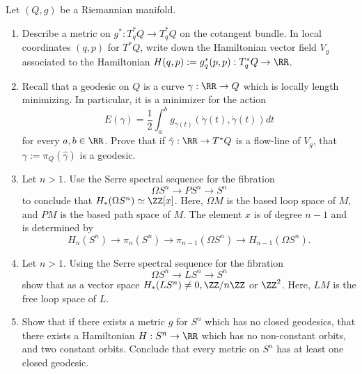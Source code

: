 
 
 \label{exr:geodesicsInSymplecticCohomology}
Let $(Q, g)$ be a Riemannian manifold. 
\begin{enumerate}
    \item Describe a metric on $ g^*:T^*_qQ\to T^*_qQ$ on the cotangent bundle. In local coordinates $(q, p)$ for $T^*Q$,  write down the Hamiltonian vector field $V_g$ associated to the Hamiltonian $H(q, p):=g_q^*(p, p): T^*_qQ\to \RR$.
    \item Recall that a geodesic on $Q$ is a curve $\gamma:\RR\to Q$ which is locally length minimizing. In particular, it is a minimizer for the action 
    \[E(\gamma)=\frac{1}{2}\int_a^b g_{\gamma(t)}(\dot \gamma(t), \dot \gamma(t)) dt\]
    for every $a,b\in \RR$. Prove that if $\hat \gamma: \RR\to T^*Q$ is a flow-line of $V_g$, that $\gamma:=\pi_Q(\hat \gamma)$ is a geodesic.
    \item Let $n>1$. Use the Serre spectral sequence for the fibration 
    \[\Omega S^n\to PS^n\to S^n\]
    to conclude that $H_*(\Omega S^n)\simeq \ZZ[x]$. Here, $\Omega M$ is the based loop space of $M$, and $PM$ is the based path space of $M$. The element $x$ is of degree $n-1$ and is determined by 
    \[H_n(S^n)\to \pi_n(S^n)\to \pi_{n-1}(\Omega S^n)\to H_{n-1}(\Omega S^n).\]
    \item Let $n>1$. Using the Serre spectral sequence for the fibration 
    \[\Omega S^n\to LS^n\to S^n\]
    show that as a vector space $H_*(LS^n)\neq 0, \ZZ/n\ZZ$ or $\ZZ^2$. Here, $LM$ is the free loop space of $L$.
    \item Show that if there exists a metric $g$ for $S^n$ which has no closed geodesics, that there exists a Hamiltonian $H: S^n\to \RR$ which has no non-constant orbits, and two constant orbits. Conclude that every metric on $S^n$ has at least one closed geodesic.
\end{enumerate}

 